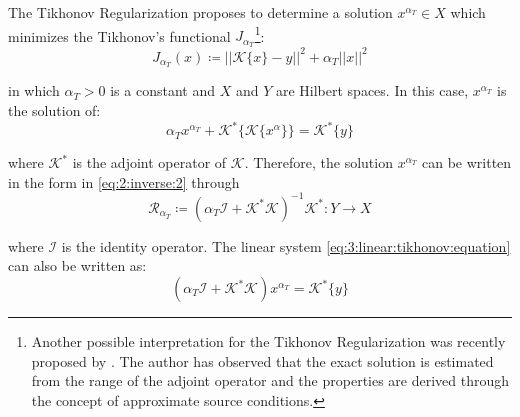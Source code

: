 			The Tikhonov Regularization proposes to determine a solution $x^{\alpha_T}\in X$ which minimizes the Tikhonov's functional $J_{\alpha_T}$\footnote{Another possible interpretation for the Tikhonov Regularization was recently proposed by \cite{gerth2021new}. The author has observed that the exact solution is estimated from the range of the adjoint operator and the properties are derived through the concept of approximate source conditions.}:
			\begin{equation}
				J_{\alpha_T}(x) \coloneqq ||\mathcal{K}\{x\}-y||^2 + \alpha_{T}||x||^2 \label{eq:3:linear:tikhonov:functional}
			\end{equation}

			\noindent in which $\alpha_{T} > 0$ is a constant and $X$ and $Y$ are Hilbert spaces. In this case, $x^{\alpha_T}$ is the solution of:
			\begin{equation}
				\alpha_Tx^{\alpha_T} + \mathcal{K}^*\{\mathcal{K}\{x^\alpha\}\} = \mathcal{K}^*\{y\} \label{eq:3:linear:tikhonov:equation}
			\end{equation}
		
			\noindent where $\mathcal{K}^*$ is the adjoint operator of $\mathcal{K}$. Therefore, the solution $x^{\alpha_T}$ can be written in the form in \eqref{eq:2:inverse:2} through
			\begin{equation}
				\mathcal{R}_{\alpha_T} \coloneqq \left(\alpha_T\mathcal{I} + \mathcal{K}^*\mathcal{K}\right)^{-1}\mathcal{K}^* : Y \rightarrow X \label{eq:3:linear:tikhonov:operator}
			\end{equation}
			
			\noindent where $\mathcal{I}$ is the identity operator. The linear system \eqref{eq:3:linear:tikhonov:equation} can also be written as:
			\begin{equation}
				\left(\alpha_T\mathcal{I} + \mathcal{K}^*\mathcal{K}\right)x^{\alpha_T} = \mathcal{K}^*\{y\} \label{eq:3:linear:tikhonov:linearsystem}
			\end{equation}
		
